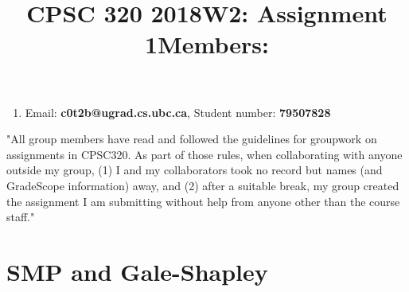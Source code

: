 \documentclass[11pt]{article}
\date{}
\title{CPSC 320 2018W2: Assignment 1}
\begin{document}
\maketitle
\title{Members:}
\begin{enumerate}
    \item Email: \textbf{c0t2b@ugrad.cs.ubc.ca}, Student number: \textbf{79507828}
\end{enumerate}
"All group
members have read and followed the guidelines for groupwork
on assignments in CPSC320. 
As part of those rules, when collaborating with anyone
outside my group, (1) I and my collaborators took no record but
names (and GradeScope information) away, and (2) after a suitable
break, my group created the assignment I am submitting without help
from anyone other than the course staff."

\section{SMP and Gale-Shapley}
\label{sec-1}
\end{document}
